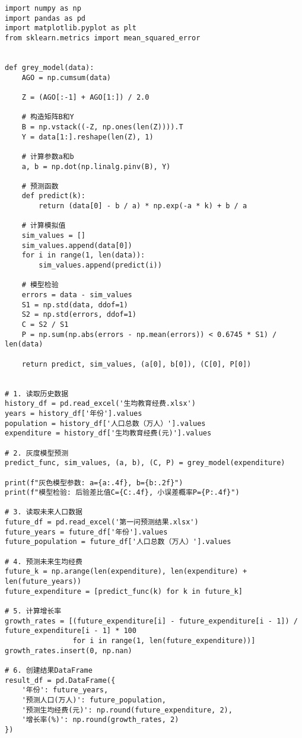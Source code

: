 \documentclass[withoutpreface,bwprint]{cumcmthesis} %
\begin{document}
\begin{verbatim}
import numpy as np
import pandas as pd
import matplotlib.pyplot as plt
from sklearn.metrics import mean_squared_error


def grey_model(data):
    AGO = np.cumsum(data)

    Z = (AGO[:-1] + AGO[1:]) / 2.0

    # 构造矩阵B和Y
    B = np.vstack((-Z, np.ones(len(Z)))).T
    Y = data[1:].reshape(len(Z), 1)

    # 计算参数a和b
    a, b = np.dot(np.linalg.pinv(B), Y)

    # 预测函数
    def predict(k):
        return (data[0] - b / a) * np.exp(-a * k) + b / a

    # 计算模拟值
    sim_values = []
    sim_values.append(data[0])
    for i in range(1, len(data)):
        sim_values.append(predict(i))

    # 模型检验
    errors = data - sim_values
    S1 = np.std(data, ddof=1)
    S2 = np.std(errors, ddof=1)
    C = S2 / S1
    P = np.sum(np.abs(errors - np.mean(errors)) < 0.6745 * S1) / len(data)

    return predict, sim_values, (a[0], b[0]), (C[0], P[0])


# 1. 读取历史数据
history_df = pd.read_excel('生均教育经费.xlsx')
years = history_df['年份'].values
population = history_df['人口总数（万人）'].values
expenditure = history_df['生均教育经费(元)'].values

# 2. 灰度模型预测
predict_func, sim_values, (a, b), (C, P) = grey_model(expenditure)

print(f"灰色模型参数: a={a:.4f}, b={b:.2f}")
print(f"模型检验: 后验差比值C={C:.4f}, 小误差概率P={P:.4f}")

# 3. 读取未来人口数据
future_df = pd.read_excel('第一问预测结果.xlsx')
future_years = future_df['年份'].values
future_population = future_df['人口总数（万人）'].values

# 4. 预测未来生均经费
future_k = np.arange(len(expenditure), len(expenditure) + len(future_years))
future_expenditure = [predict_func(k) for k in future_k]

# 5. 计算增长率
growth_rates = [(future_expenditure[i] - future_expenditure[i - 1]) / future_expenditure[i - 1] * 100
                for i in range(1, len(future_expenditure))]
growth_rates.insert(0, np.nan)

# 6. 创建结果DataFrame
result_df = pd.DataFrame({
    '年份': future_years,
    '预测人口(万人)': future_population,
    '预测生均经费(元)': np.round(future_expenditure, 2),
    '增长率(%)': np.round(growth_rates, 2)
})
\end{verbatim}
\end{document}
